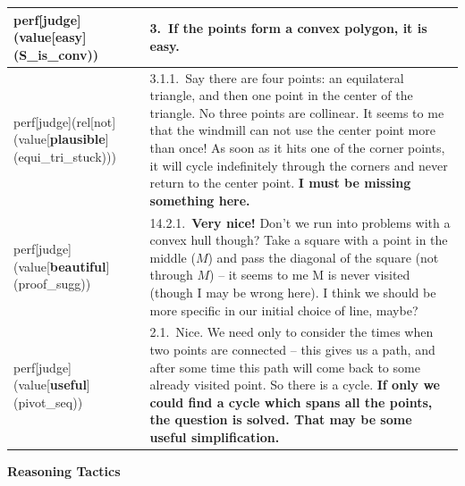 \documentclass[smallextended,oneside]{svjour3}       %
\newcounter{turn}
\begin{document}
\noindent
\noindent\begin{tabular}{|p{}|p{}|}
\hline
perf[judge](value[\textbf{easy}](S_is_conv)) & 3.~\textbf{If the points form a convex polygon, it is easy.}\\ \hline
perf[judge](rel[not](value[\textbf{plausible}](equi_tri_stuck))) & 3.1.1.~Say there are four points: an equilateral triangle, and then one point in the center of the triangle. No three points are collinear. It seems to me that the windmill can not use the center point more than once! As soon as it hits one of the corner points, it will cycle indefinitely through the corners and never return to the center point. \textbf{I must be missing something here.}\\ \hline
perf[judge](value[\textbf{beautiful}](proof_sugg)) & 14.2.1.~\textbf{Very nice!} Don't we run into problems with a convex hull though? Take a square with a point in the middle ($M$) and pass the diagonal of the square (not through $M$) -- it seems to me M is never visited (though I may be wrong here). I think we should be more specific in our initial choice of line, maybe?\\ \hline
perf[judge](value[\textbf{useful}](pivot_seq)) & 2.1.~Nice. We need only to consider the times when two points are connected -- this gives us a path, and after some time this path will come back to some already visited point. So there is a cycle.  \textbf{If only we could find a cycle which spans all the points, the question is solved. That may be some useful simplification.}\\ \hline
\end{tabular}

\medskip

{\centering
\textbf{Reasoning Tactics} 

\par}

\smallskip
\end{document}
